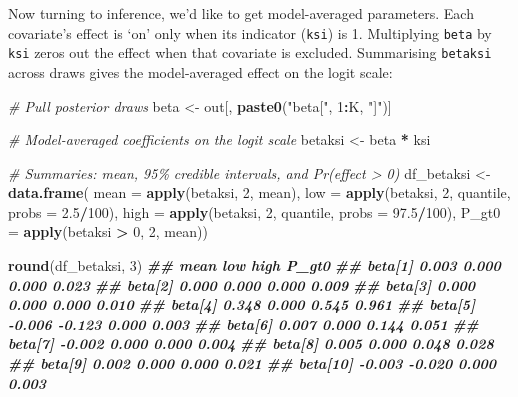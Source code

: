 \documentclass[
  12pt,
]{krantz}
\newenvironment{Shaded}{\begin{snugshade}}{\end{snugshade}}
\newcommand{\AttributeTok}[1]{\textcolor[rgb]{0.13,0.29,0.53}{#1}}
\newcommand{\CommentTok}[1]{\textcolor[rgb]{0.56,0.35,0.01}{\textit{#1}}}
\newcommand{\DecValTok}[1]{\textcolor[rgb]{0.00,0.00,0.81}{#1}}
\newcommand{\DocumentationTok}[1]{\textcolor[rgb]{0.56,0.35,0.01}{\textbf{\textit{#1}}}}
\newcommand{\FloatTok}[1]{\textcolor[rgb]{0.00,0.00,0.81}{#1}}
\newcommand{\FunctionTok}[1]{\textcolor[rgb]{0.13,0.29,0.53}{\textbf{#1}}}
\newcommand{\NormalTok}[1]{#1}
\newcommand{\OtherTok}[1]{\textcolor[rgb]{0.56,0.35,0.01}{#1}}
\newcommand{\SpecialCharTok}[1]{\textcolor[rgb]{0.81,0.36,0.00}{\textbf{#1}}}
\newcommand{\StringTok}[1]{\textcolor[rgb]{0.31,0.60,0.02}{#1}}
\begin{document}
Now turning to inference, we'd like to get model-averaged parameters. Each covariate's effect is `on' only when its indicator (\texttt{ksi}) is 1. Multiplying \texttt{beta} by \texttt{ksi} zeros out the effect when that covariate is excluded. Summarising \texttt{betaksi} across draws gives the model-averaged effect on the logit scale:

\begin{Shaded}
\begin{Highlighting}[]
\CommentTok{\# Pull posterior draws}
\NormalTok{beta  }\OtherTok{\textless{}{-}}\NormalTok{ out[, }\FunctionTok{paste0}\NormalTok{(}\StringTok{"beta["}\NormalTok{, }\DecValTok{1}\SpecialCharTok{:}\NormalTok{K, }\StringTok{"]"}\NormalTok{)]}

\CommentTok{\# Model{-}averaged coefficients on the logit scale}
\NormalTok{betaksi }\OtherTok{\textless{}{-}}\NormalTok{ beta }\SpecialCharTok{*}\NormalTok{ ksi}

\CommentTok{\# Summaries: mean, 95\% credible intervals, and Pr(effect \textgreater{} 0)}
\NormalTok{df\_betaksi }\OtherTok{\textless{}{-}} \FunctionTok{data.frame}\NormalTok{(}
  \AttributeTok{mean  =} \FunctionTok{apply}\NormalTok{(betaksi, }\DecValTok{2}\NormalTok{, mean),}
  \AttributeTok{low  =} \FunctionTok{apply}\NormalTok{(betaksi, }\DecValTok{2}\NormalTok{, quantile, }\AttributeTok{probs =} \FloatTok{2.5}\SpecialCharTok{/}\DecValTok{100}\NormalTok{),}
  \AttributeTok{high  =} \FunctionTok{apply}\NormalTok{(betaksi, }\DecValTok{2}\NormalTok{, quantile, }\AttributeTok{probs =} \FloatTok{97.5}\SpecialCharTok{/}\DecValTok{100}\NormalTok{),}
  \AttributeTok{P\_gt0 =} \FunctionTok{apply}\NormalTok{(betaksi }\SpecialCharTok{\textgreater{}} \DecValTok{0}\NormalTok{, }\DecValTok{2}\NormalTok{, mean))}

\FunctionTok{round}\NormalTok{(df\_betaksi, }\DecValTok{3}\NormalTok{)}
\DocumentationTok{\#\#            mean    low  high P\_gt0}
\DocumentationTok{\#\# beta[1]   0.003  0.000 0.000 0.023}
\DocumentationTok{\#\# beta[2]   0.000  0.000 0.000 0.009}
\DocumentationTok{\#\# beta[3]   0.000  0.000 0.000 0.010}
\DocumentationTok{\#\# beta[4]   0.348  0.000 0.545 0.961}
\DocumentationTok{\#\# beta[5]  {-}0.006 {-}0.123 0.000 0.003}
\DocumentationTok{\#\# beta[6]   0.007  0.000 0.144 0.051}
\DocumentationTok{\#\# beta[7]  {-}0.002  0.000 0.000 0.004}
\DocumentationTok{\#\# beta[8]   0.005  0.000 0.048 0.028}
\DocumentationTok{\#\# beta[9]   0.002  0.000 0.000 0.021}
\DocumentationTok{\#\# beta[10] {-}0.003 {-}0.020 0.000 0.003}
\end{Highlighting}
\end{Shaded}
\end{document}
